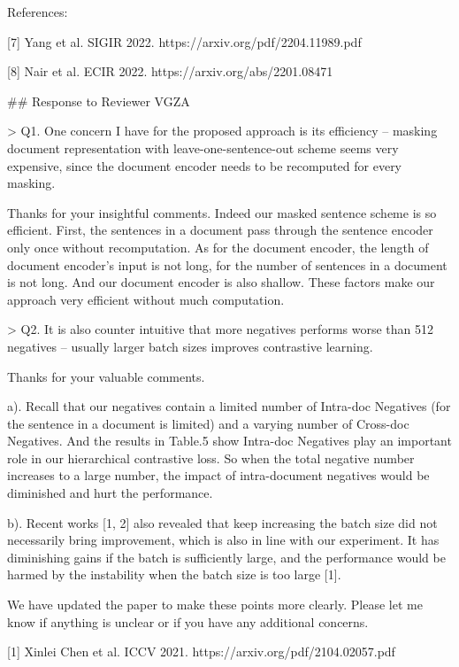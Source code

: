 References:

[7] Yang et al. SIGIR 2022. https://arxiv.org/pdf/2204.11989.pdf

[8] Nair et al. ECIR 2022. https://arxiv.org/abs/2201.08471



## Response to Reviewer VGZA

> Q1. One concern I have for the proposed approach is its efficiency -- masking document representation with leave-one-sentence-out scheme seems very expensive, since the document encoder needs to be recomputed for every masking.

Thanks for your insightful comments. Indeed our masked sentence scheme is so efficient. First, the sentences in a document pass through the sentence encoder only once without recomputation. As for the document encoder, the length of document encoder's input is not long, for the number of sentences in a document is not long. And our document encoder is also shallow. These factors make our approach very efficient without much computation.



> Q2. It is also counter intuitive that more negatives performs worse than 512 negatives -- usually larger batch sizes improves contrastive learning.

Thanks for your valuable comments. 

a). Recall that our negatives contain a limited number of Intra-doc Negatives (for the sentence in a document is limited) and a varying number of Cross-doc Negatives. And the results in Table.5 show Intra-doc Negatives play an important role in our hierarchical contrastive loss. So when the total negative number increases to a large number, the impact of intra-document negatives would be diminished and hurt the performance. 

b). Recent works [1, 2] also revealed that keep increasing the batch size did not necessarily bring improvement, which is also in line with our experiment. It has diminishing gains if the batch is sufficiently large, and the performance would be harmed by the instability when the batch size is too large [1].



We have updated the paper to make these points more clearly. Please let me know if anything is unclear or if you have any additional concerns.



[1] Xinlei Chen et al. ICCV 2021. https://arxiv.org/pdf/2104.02057.pdf

